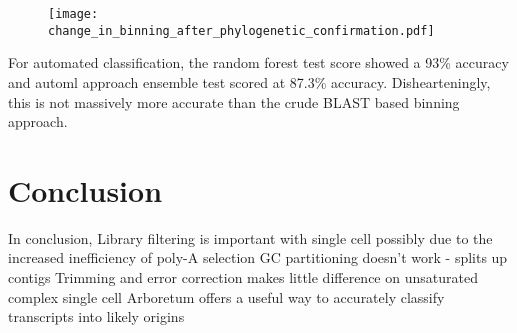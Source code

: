 \begin{figure}
    \texttt{[image: change\_in\_binning\_after\_phylogenetic\_confirmation.pdf]}
\end{figure}

For automated classification, the random forest test score showed a 93\% accuracy and automl approach ensemble test scored at 87.3\% accuracy.
Dishearteningly, this is not massively more accurate than the crude BLAST based binning approach.
     

\section{Conclusion}

In conclusion,
Library filtering is important with single cell possibly due to the increased inefficiency of poly-A selection
GC partitioning doesn't work - splits up contigs
Trimming and error correction makes little difference on unsaturated complex single cell 
Arboretum offers a useful way to accurately classify transcripts into likely origins 



